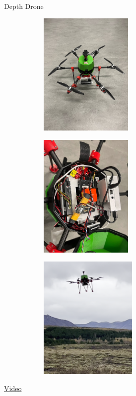 \documentclass[aspectratio=169]{beamer}
\newcommand{\nologo}{\setbeamertemplate{logo}{}}
\newif\ifpause
\newcommand{\mypause}{\ifpause \pause \fi}
\begin{document}
\nologo
\begin{frame}{Depth Drone}
	\vspace{0.5cm}
	\begin{figure}[]
	    \centering
	    \begin{subfigure}[b]{0.3\linewidth}
		\includegraphics[height=6cm]{./images/depth_drone}
		\label{figure:whycode_bundle}
	    \end{subfigure}
		\mypause
		\hfill
	    \begin{subfigure}[b]{0.3\linewidth}
		\includegraphics[height=6cm]{./images/depth_drone_electronics}
		\label{figure:apriltag24h10}
	    \end{subfigure}
		\mypause
		\hfill
	    \begin{subfigure}[b]{0.3\linewidth}
		\includegraphics[height=6cm]{./images/depth_drone_flying}
		\label{figure:apriltag24h10}
	    \end{subfigure}
	\end{figure}

	\vspace{-1cm}
	\href{https://photos.google.com/share/AF1QipNXTuJ1jwBbWXkfmRTWAf_jNwcutEZrpX_9k5u5lWiPdUfPsY21TfGQF_UkUXHqSA/photo/AF1QipPmBs1g8-xC1YvqdGMdKUgzxI1iednbFL9lDDPQ?key=Q1RjLVUybUlUUlB6ZlNHR1Z1WXRYTmhsb1Z2S1pR}{Video}

\end{frame}
\end{document}
